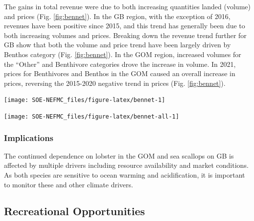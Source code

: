 \documentclass[
  10pt,
]{article}
\let\origfigure\figure
\let\endorigfigure\endfigure
\renewenvironment{figure}[1][2] {
    \expandafter\origfigure\expandafter[H]
} {
    \endorigfigure
}
\begin{document}
The gains in total revenue were due to both increasing quantities landed (volume) and prices (Fig. \ref{fig:bennet}). In the GB region, with the exception of 2016, revenues have been positive since 2015, and this trend has generally been due to both increasing volumes and prices. Breaking down the revenue trend further for GB show that both the volume and price trend have been largely driven by Benthos category (Fig. \ref{fig:bennet}). In the GOM region, increased volumes for the ``Other'' and Benthivore categories drove the increase in volume. In 2021, prices for Benthivores and Benthos in the GOM caused an overall increase in prices, reversing the 2015-2020 negative trend in prices (Fig. \ref{fig:bennet}).

\begin{figure}

{\centering \texttt{[image: SOE-NEFMC\_files/figure-latex/bennet-1]} 

}

\caption{Revenue change from the 1982 baseline in 2023 dollars (black), price, and volume for commercial landings from Georges Bank (GB: left) and the Gulf of Maine (GOM: right)}\label{fig:bennet}
\end{figure}

\begin{figure}

{\centering \texttt{[image: SOE-NEFMC\_files/figure-latex/bennet-all-1]} 

}

\caption{Revenue change from the long-term mean in 2023 dollars (black), price, and volume for commercial landings from Georges Bank (GB: top panels) and the Gulf of Maine (GOM: bottom panels)}\label{fig:bennet-all}
\end{figure}

\hypertarget{implications-1}{%
\subsubsection{Implications}\label{implications-1}}

The continued dependence on lobster in the GOM and sea scallops on GB is affected by multiple drivers including resource availability and market conditions. As both species are sensitive to ocean warming and acidification, it is important to monitor these and other climate drivers.

\hypertarget{recreational-opportunities}{%
\subsection{Recreational Opportunities}\label{recreational-opportunities}}
\end{document}

